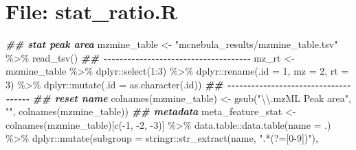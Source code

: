 \documentclass[
]{article}
\newenvironment{Shaded}{\begin{snugshade}}{\end{snugshade}}
\newcommand{\AttributeTok}[1]{\textcolor[rgb]{0.77,0.63,0.00}{#1}}
\newcommand{\DecValTok}[1]{\textcolor[rgb]{0.00,0.00,0.81}{#1}}
\newcommand{\DocumentationTok}[1]{\textcolor[rgb]{0.56,0.35,0.01}{\textbf{\textit{#1}}}}
\newcommand{\FunctionTok}[1]{\textcolor[rgb]{0.00,0.00,0.00}{#1}}
\newcommand{\NormalTok}[1]{#1}
\newcommand{\OtherTok}[1]{\textcolor[rgb]{0.56,0.35,0.01}{#1}}
\newcommand{\SpecialCharTok}[1]{\textcolor[rgb]{0.00,0.00,0.00}{#1}}
\newcommand{\StringTok}[1]{\textcolor[rgb]{0.31,0.60,0.02}{#1}}
\begin{document}
\hypertarget{file-stat_ratio.r}{%
\section{File: stat\_ratio.R}\label{file-stat_ratio.r}}

\begin{Shaded}
\begin{Highlighting}[]
\DocumentationTok{\#\# stat peak area}
\NormalTok{mzmine\_table }\OtherTok{\textless{}{-}} \StringTok{"mcnebula\_results/mzmine\_table.tsv"} \SpecialCharTok{\%\textgreater{}\%} 
  \FunctionTok{read\_tsv}\NormalTok{()}
\DocumentationTok{\#\# {-}{-}{-}{-}{-}{-}{-}{-}{-}{-}{-}{-}{-}{-}{-}{-}{-}{-}{-}{-}{-}{-}{-}{-}{-}{-}{-}{-}{-}{-}{-}{-}{-}{-}{-}{-}{-} }
\NormalTok{mz\_rt }\OtherTok{\textless{}{-}}\NormalTok{ mzmine\_table }\SpecialCharTok{\%\textgreater{}\%} 
\NormalTok{  dplyr}\SpecialCharTok{::}\FunctionTok{select}\NormalTok{(}\DecValTok{1}\SpecialCharTok{:}\DecValTok{3}\NormalTok{) }\SpecialCharTok{\%\textgreater{}\%} 
\NormalTok{  dplyr}\SpecialCharTok{::}\FunctionTok{rename}\NormalTok{(}\AttributeTok{.id =} \DecValTok{1}\NormalTok{, }\AttributeTok{mz =} \DecValTok{2}\NormalTok{, }\AttributeTok{rt =} \DecValTok{3}\NormalTok{) }\SpecialCharTok{\%\textgreater{}\%} 
\NormalTok{  dplyr}\SpecialCharTok{::}\FunctionTok{mutate}\NormalTok{(}\AttributeTok{.id =} \FunctionTok{as.character}\NormalTok{(.id))}
\DocumentationTok{\#\# {-}{-}{-}{-}{-}{-}{-}{-}{-}{-}{-}{-}{-}{-}{-}{-}{-}{-}{-}{-}{-}{-}{-}{-}{-}{-}{-}{-}{-}{-}{-}{-}{-}{-}{-}{-}{-} }
\DocumentationTok{\#\# reset name}
\FunctionTok{colnames}\NormalTok{(mzmine\_table) }\OtherTok{\textless{}{-}} \FunctionTok{gsub}\NormalTok{(}\StringTok{"}\SpecialCharTok{\textbackslash{}\textbackslash{}}\StringTok{.mzML Peak area"}\NormalTok{, }\StringTok{""}\NormalTok{, }\FunctionTok{colnames}\NormalTok{(mzmine\_table))}
\DocumentationTok{\#\# metadata}
\NormalTok{meta\_feature\_stat }\OtherTok{\textless{}{-}} \FunctionTok{colnames}\NormalTok{(mzmine\_table)[}\FunctionTok{c}\NormalTok{(}\SpecialCharTok{{-}}\DecValTok{1}\NormalTok{, }\SpecialCharTok{{-}}\DecValTok{2}\NormalTok{, }\SpecialCharTok{{-}}\DecValTok{3}\NormalTok{)] }\SpecialCharTok{\%\textgreater{}\%} 
\NormalTok{  data.table}\SpecialCharTok{::}\FunctionTok{data.table}\NormalTok{(}\AttributeTok{name =}\NormalTok{ .) }\SpecialCharTok{\%\textgreater{}\%} 
\NormalTok{  dplyr}\SpecialCharTok{::}\FunctionTok{mutate}\NormalTok{(}\AttributeTok{subgroup =}\NormalTok{ stringr}\SpecialCharTok{::}\FunctionTok{str\_extract}\NormalTok{(name, }\StringTok{".*(?=[0{-}9])"}\NormalTok{),}

\end{Highlighting}
\end{Shaded}
\end{document}
